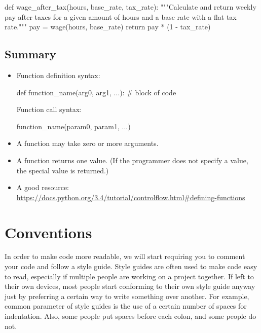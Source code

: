\documentclass[11pt]{cselabheader}
\begin{document}
{\begin{python3code}
def wage_after_tax(hours, base_rate, tax_rate):
    """Calculate and return weekly pay after taxes for a given amount of hours and a 
    base rate with a flat tax rate."""
    pay = wage(hours, base_rate)
    return pay * (1 - tax_rate)
\end{python3code}

\subsection{Summary}
\label{subsec:funcs.sum}

\begin{itemize}
  \item Function definition syntax:

    \begin{python3code}
def function_name(arg0, arg1, ...):
    # block of code
    \end{python3code}

    Function call syntax:

    \begin{python3code}
function_name(param0, param1, ...)
    \end{python3code}

  \item A function may take zero or more arguments.

  \item A function returns one value. (If the programmer does not specify a
    value, the special value  is returned.)

  \item A good resource: \url{https://docs.python.org/3.4/tutorial/controlflow.html#defining-functions}
\end{itemize}


\pagebreak
\section{Conventions}
\label{sec:pep8}

In order to make code more readable, we will start requiring you to comment your
code and follow a style guide. Style guides are often used to make code easy to
read, especially if multiple people are working on a project together. If left
to their own devices, most people start conforming to their own style guide
anyway just by preferring a certain way to write something over another. For
example, common parameter of style guides is the use of a certain number of
spaces for indentation. Also, some people put spaces before each colon, and some
people do not.

}
\end{document}
